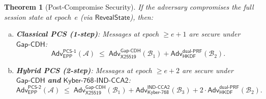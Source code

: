 \documentclass[11pt,a4paper]{article}
\newtheorem{theorem}{Theorem}[section]
\theoremstyle{definition}
\theoremstyle{remark}
\newcommand{\adv}{\mathsf{Adv}}
\newcommand{\advA}{\mathcal{A}}
\newcommand{\advB}{\mathcal{B}}
\newcommand{\HKDF}{\mathsf{HKDF}}
\renewcommand{\DH}{\mathsf{X25519}}
\newcommand{\KEM}{\mathsf{Kyber\text{-}768}}
\newcommand{\GapCDH}{\mathsf{Gap\text{-}CDH}}
\newcommand{\INDCCA}{\mathsf{IND\text{-}CCA2}}
\newcommand{\dualPRF}{\mathsf{dual\text{-}PRF}}
\begin{document}
\begin{theorem}[Post-Compromise Security]
\label{thm:pcs}
If the adversary compromises the full session state at epoch~$e$ (via
$\mathsf{RevealState}$), then:
\begin{enumerate}[(a)]
  \item \textbf{Classical PCS (1-step)}: Messages at epoch $\geq e{+}1$ are
        secure under $\GapCDH$:
        \[
          \adv^{\mathsf{PCS\text{-}1}}_{\mathsf{EPP}}(\advA)
          \;\leq\; \adv^{\GapCDH}_{\DH}(\advB_1) +
          \adv^{\dualPRF}_{\HKDF}(\advB_2).
        \]
  \item \textbf{Hybrid PCS (2-step)}: Messages at epoch $\geq e{+}2$ are
        secure under $\GapCDH$ \textbf{and} $\KEM$-$\INDCCA$:
        \[
          \adv^{\mathsf{PCS\text{-}2}}_{\mathsf{EPP}}(\advA)
          \;\leq\; \adv^{\GapCDH}_{\DH}(\advB_1) +
          \adv^{\INDCCA}_{\KEM}(\advB_3) +
          2 \cdot \adv^{\dualPRF}_{\HKDF}(\advB_2).
        \]
\end{enumerate}
\end{theorem}
\end{document}
